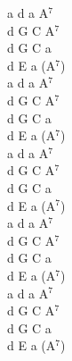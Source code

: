 \documentclass[a5paper, 10pt]{book}
\begin{document}
\begin{minipage}[t]{0.2\textwidth}
  a d a A$^7$\\
  d G C A$^7$\\
  d G C a\\
  d E a (A$^7$)\\

  a d a A$^7$\\
  d G C A$^7$\\
  d G C a\\
  d E a (A$^7$)\\

  a d a A$^7$\\
  d G C A$^7$\\
  d G C a\\
  d E a (A$^7$)\\

  a d a A$^7$\\
  d G C A$^7$\\
  d G C a\\
  d E a (A$^7$)\\

  a d a A$^7$\\
  d G C A$^7$\\
  d G C a\\
  d E a (A$^7$)\\
\end{minipage}

\newpage
\end{document}
